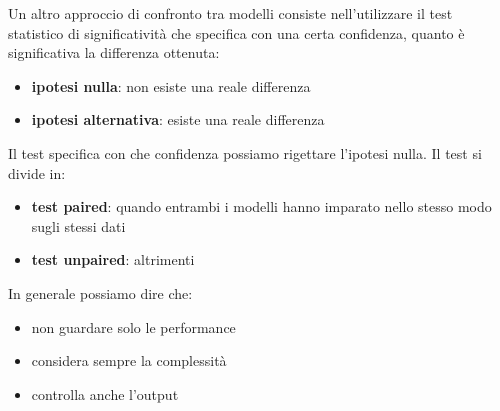 Un altro approccio di confronto tra modelli consiste nell'utilizzare il test statistico
di significatività che specifica con una certa confidenza, quanto è significativa
la differenza ottenuta:
\begin{itemize}
    \item \textbf{ipotesi nulla}: non esiste una reale differenza
    \item \textbf{ipotesi alternativa}: esiste una reale differenza
\end{itemize}
Il test specifica con che confidenza possiamo rigettare l'ipotesi nulla.
Il test si divide in:
\begin{itemize}
    \item \textbf{test paired}: quando entrambi i modelli hanno imparato nello
          stesso modo sugli stessi dati
    \item \textbf{test unpaired}: altrimenti
\end{itemize}
In generale possiamo dire che:
\begin{itemize}
    \item non guardare solo le performance
    \item considera sempre la complessità
    \item controlla anche l'output
\end{itemize}